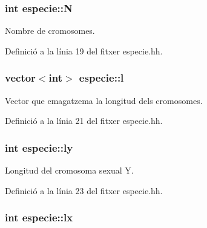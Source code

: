 \subsubsection[{\texorpdfstring{N}{N}}]{\setlength{\rightskip}{0pt plus 5cm}int especie\+::N\hspace{0.3cm}{\ttfamily [private]}}\hypertarget{classespecie_a3333db40d4af2c0073d50afea08e0296}{}\label{classespecie_a3333db40d4af2c0073d50afea08e0296}


Nombre de cromosomes. 



Definició a la línia 19 del fitxer especie.\+hh.

\subsubsection[{\texorpdfstring{l}{l}}]{\setlength{\rightskip}{0pt plus 5cm}vector$<$int$>$ especie\+::l\hspace{0.3cm}{\ttfamily [private]}}\hypertarget{classespecie_a754d7eefb82d1ebe3f573cff16dd43ee}{}\label{classespecie_a754d7eefb82d1ebe3f573cff16dd43ee}


Vector que emagatzema la longitud dels cromosomes. 



Definició a la línia 21 del fitxer especie.\+hh.

\subsubsection[{\texorpdfstring{ly}{ly}}]{\setlength{\rightskip}{0pt plus 5cm}int especie\+::ly\hspace{0.3cm}{\ttfamily [private]}}\hypertarget{classespecie_ad6993a4730779e367c432cce91780895}{}\label{classespecie_ad6993a4730779e367c432cce91780895}


Longitud del cromosoma sexual Y. 



Definició a la línia 23 del fitxer especie.\+hh.

\subsubsection[{\texorpdfstring{lx}{lx}}]{\setlength{\rightskip}{0pt plus 5cm}int especie\+::lx\hspace{0.3cm}{\ttfamily [private]}}\hypertarget{classespecie_af620813fbc24dd91e5a25d38b5847bf8}{}\label{classespecie_af620813fbc24dd91e5a25d38b5847bf8}


